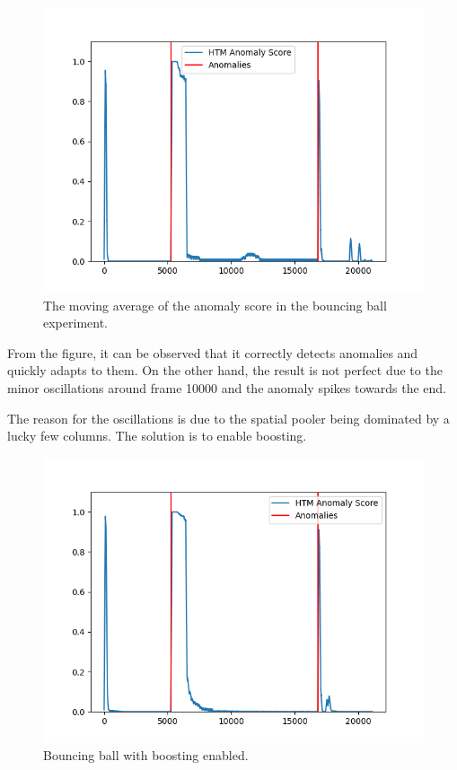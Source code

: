 \begin{figure}[H]
    \centering
    \includegraphics[width=\textwidth]{resources/experiments/bouncing_ball/bb_anoms_bad.png}
    \caption{The moving average of the anomaly score in the bouncing ball experiment.}
\end{figure}
From the figure, it can be observed that it correctly detects anomalies and quickly adapts to them. On the other hand, the result is not perfect due to the minor oscillations around frame 10000 and the anomaly spikes towards the end. \par
The reason for the oscillations is due to the spatial pooler being dominated by a lucky few columns. The solution is to enable boosting.\par
\begin{figure}[H]
    \centering
    \includegraphics[width=\textwidth]{resources/experiments/bouncing_ball/bb_anoms_boosting.png}
    \caption{Bouncing ball with boosting enabled.}
\end{figure}
